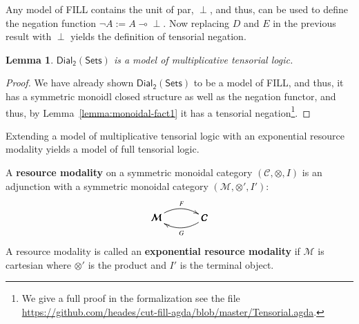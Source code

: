 \documentclass[preprint,6pt]{elsarticle}
\newcommand{\cat}[1]{\mathcal{#1}}
\newcommand{\limp}[0]{\multimap}
\newcommand{\dial}[0]{\mathsf{Dial_2}(\mathsf{Sets})}
\newtheorem{lemma}[theorem]{Lemma}
\begin{document}
Any model of FILL contains the unit of par, $\perp$, and thus, can be
used to define the negation function $\lnot A := A \limp \perp$.  Now
replacing $D$ and $E$ in the previous result with $\perp$ yields the
definition of tensorial negation.
\begin{lemma}
  \label{lemma:dial-tensorial}
  $\dial$ is a model of multiplicative tensorial logic.
\end{lemma}
\begin{proof}
  We have already shown $\dial$ to be a model of FILL, and thus, it has a
  symmetric monoidl closed structure as well as the negation functor, and thus, by
  Lemma~\ref{lemma:monoidal-fact1} it has a tensorial
  negation\footnote{We give a full proof in the formalization see the
    file
    \url{https://github.com/heades/cut-fill-agda/blob/master/Tensorial.agda}.}.
\end{proof}

Extending a model of multiplicative tensorial logic with an exponential
resource modality yields a model of full tensorial logic.
\begin{definition}
  \label{def:resource-modality}
  A \textbf{resource modality} on a symmetric monoidal category
  $(\cat{C}, \otimes, I)$ is an adjunction with a symmetric monoidal
  category $(\cat{M}, \otimes', I')$:
  \[
  \bfig
  \morphism(0,0)|a|/{@{>}@/^1em/}/<500,0>[\cat{M}`\cat{C};F]
  \morphism(0,0)|b|/{@{<-}@/_1em/}/<500,0>[\cat{M}`\cat{C};G]
  \efig
  \]
  A resource modality is called an \textbf{exponential resource
    modality} if $\cat{M}$ is cartesian where $\otimes'$ is the
  product and $I'$ is the terminal object.
\end{definition}
\end{document}
